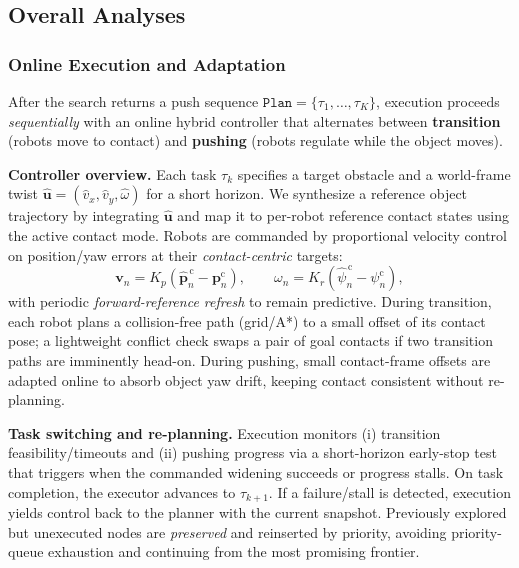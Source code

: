 \subsection{Overall Analyses}\label{subsec:overall}
\subsubsection{Online Execution and Adaptation}\label{subsec:execute}
After the search returns a push sequence $\texttt{Plan}=\{\tau_1,\ldots,\tau_K\}$,
execution proceeds \emph{sequentially} with an online hybrid controller that
alternates between \textbf{transition} (robots move to contact) and \textbf{pushing}
(robots regulate while the object moves).

\textbf{Controller overview.}
Each task $\tau_k$ specifies a target obstacle and a world-frame twist
$\widehat{\mathbf{u}}=(\widehat{v}_x,\widehat{v}_y,\widehat{\omega})$ for a short
horizon. We synthesize a reference object trajectory by integrating
$\widehat{\mathbf{u}}$ and map it to per-robot reference contact states using the
active contact mode. Robots are commanded by proportional velocity control on
position/yaw errors at their \emph{contact-centric} targets:
\[
\mathbf{v}_n = K_{\!p}\!\left(\widehat{\mathbf{p}}^{\,\text{c}}_n - \mathbf{p}^{\text{c}}_n\right),
\qquad
\omega_n = K_{\!r}\!\left(\widehat{\psi}^{\,\text{c}}_n - \psi^{\text{c}}_n\right),
\]
with periodic \emph{forward-reference refresh} to remain predictive. During
transition, each robot plans a collision-free path (grid/A*) to a small offset of
its contact pose; a lightweight conflict check swaps a pair of goal contacts if two
transition paths are imminently head-on. During pushing, small contact-frame offsets
are adapted online to absorb object yaw drift, keeping contact consistent without
re-planning.

\textbf{Task switching and re-planning.}
Execution monitors (i) transition feasibility/timeouts and (ii) pushing progress via
a short-horizon early-stop test that triggers when the commanded widening succeeds
or progress stalls. On task completion, the executor advances to $\tau_{k+1}$. If a
failure/stall is detected, execution yields control back to the planner with the
current snapshot. Previously explored but unexecuted nodes are \emph{preserved} and
reinserted by priority, avoiding priority-queue exhaustion and continuing from the
most promising frontier.

